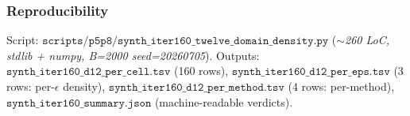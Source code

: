 \subsubsection{Reproducibility}

Script: $\texttt{scripts/p5p8/synth\_iter160\_twelve\_domain\_density.py}$
(\textit{$\sim$260 LoC, stdlib + numpy, B=2000 seed=20260705}).
Outputs:
$\texttt{synth\_iter160\_d12\_per\_cell.tsv}$ (160 rows),
$\texttt{synth\_iter160\_d12\_per\_eps.tsv}$ (3 rows: per-$\epsilon$
density),
$\texttt{synth\_iter160\_d12\_per\_method.tsv}$ (4 rows: per-method),
$\texttt{synth\_iter160\_summary.json}$ (machine-readable verdicts).
